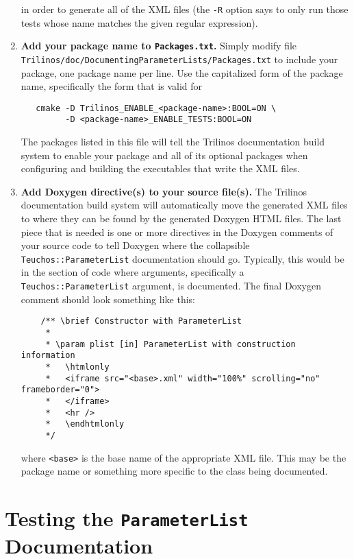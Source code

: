 \documentclass[pdf,ps2pdf,12pt]{smemo}
\begin{document}
\begin{memo}
\begin{enumerate}
  in order to generate all of the XML files (the \texttt{-R} option
  says to only run those tests whose name matches the given regular
  expression).

\item \textbf{Add your package name to \texttt{Packages.txt}.} Simply
  modify file
  \texttt{Trilinos/\-doc/\-Documenting\-Parameter\-Lists/\-Packages.txt}
  to include your package, one package name per line.  Use the
  capitalized form of the package name, specifically the form that is
  valid for

 \begin{verbatim}
   cmake -D Trilinos_ENABLE_<package-name>:BOOL=ON \
         -D <package-name>_ENABLE_TESTS:BOOL=ON
 \end{verbatim}

  The packages listed in this file will tell the Trilinos
  documentation build system to enable your package and all of its
  optional packages when configuring and building the executables that
  write the XML files.

\item \textbf{Add Doxygen directive(s) to your source file(s).} The
  Trilinos documentation build system will automatically move the
  generated XML files to where they can be found by the generated
  Doxygen HTML files. The last piece that is needed is one or more
  directives in the Doxygen comments of your source code to tell
  Doxygen where the collapsible \texttt{Teuchos::ParameterList}
  documentation should go. Typically, this would be in the section of
  code where arguments, specifically a \texttt{Teuchos::ParameterList}
  argument, is documented. The final Doxygen comment should look
  something like this:

 \footnotesize
 \begin{verbatim}
    /** \brief Constructor with ParameterList
     * 
     * \param plist [in] ParameterList with construction information
     *   \htmlonly
     *   <iframe src="<base>.xml" width="100%" scrolling="no" frameborder="0">
     *   </iframe>
     *   <hr />
     *   \endhtmlonly
     */
 \end{verbatim}
 \normalsize

 where \texttt{<base>} is the base name of the appropriate XML file.
 This may be the package name or something more specific to the class
 being documented.

\end{enumerate}

\section{Testing the \texttt{ParameterList} Documentation}


\end{memo}
\end{document}

